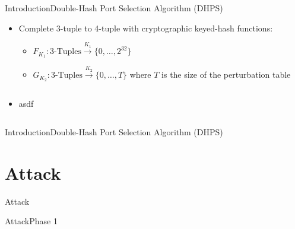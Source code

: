 \documentclass[aspectratio=169, hyperref={colorlinks=true, allcolors=SecondaryColor}, c]{beamer}
\begin{document}
\begin{frame}[fragile]{Introduction}{Double-Hash Port Selection Algorithm (DHPS)}
	\begin{itemize}
		\item Complete 3-tuple to 4-tuple with cryptographic keyed-hash functions:
		\begin{itemize}
			\scriptsize
			\item \( F_{K_1}: \text{3-Tuples} \xrightarrow{K_1} \{0, \ldots, 2^{32}\}\)
			\item \( G_{K_2}: \text{3-Tuples} \xrightarrow{K_2} \{0, \ldots, T\}\) where $T$ is the size of the \alert{perturbation table}
		\end{itemize}
	\end{itemize}
	\begin{columns}
		\begin{column}{0.5\textwidth}
      \begin{itemize}
        \item asdf
      \end{itemize}
		\end{column}
		\begin{column}{0.5\textwidth}
			\begin{center}
				\begin{adjustbox}{max width=\textwidth}
				\end{adjustbox}
			\end{center}
		\end{column}
	\end{columns}
\end{frame}

\begin{frame}[fragile]{Introduction}{Double-Hash Port Selection Algorithm (DHPS)}
	\begin{center}
		\begin{adjustbox}{scale=0.7}
			
		\end{adjustbox}
	\end{center}
\end{frame}

\section{Attack}

\begin{frame}[fragile]{Attack}{}
\end{frame}

\begin{frame}[fragile]{Attack}{Phase 1}
	\begin{center}
		\begin{adjustbox}{scale=0.7}
			
		\end{adjustbox}
	\end{center}
\end{frame}
\end{document}
